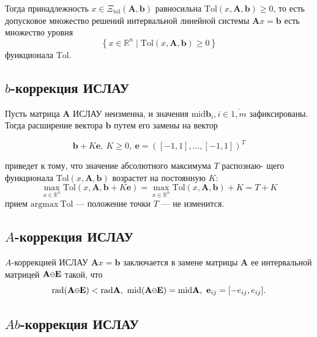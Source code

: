 \documentclass{article}
\newcommand{\kaucher}{
  \begin{tikzpicture}
    \draw (0, 0) circle (0.6ex);
    \draw (-0.6ex, 0) -- (0.6ex, 0);
  \end{tikzpicture}%
}
\begin{document}
  Тогда принадлежность \( x \in \Xi_{\text{tol}} (\mathbf{A}, \mathbf{b}) \)
  равносильна \( \text{Tol} (x, \mathbf{A}, \mathbf{b}) \geq 0 \), то есть
  допусковое множество решений интервальной линейной системы
  \( \mathbf{A} x = \mathbf{b} \) есть множество уровня
  \[
    \left \{ x \in \mathbb{R}^n \mid \text{Tol} (x, \mathbf{A}, \mathbf{b}) \geq 0 \right \}
  \]
  функционала \( \text{Tol} \).

  \vspace{\baselineskip}

  \subsection{\( b \)-коррекция ИСЛАУ}

  Пусть матрица \( \mathbf{A} \) ИСЛАУ неизменна, и значения
  \( \text{mid} \mathbf{b}_i, i \in \overline{1,m} \) зафиксированы. Тогда
  расширение вектора \( \mathbf{b} \) путем его замены на вектор

  \begin{equation} \label{eq:b-correction}
    \mathbf{b} + K\mathbf{e}, \ K \ge 0, \ \mathbf{e} = ([-1, 1], \dots, [-1, 1])^T
  \end{equation}

  приведет к тому, что значение абсолютного максимума \( T \) распознаю-
  щего функционала \( \text{Tol} (x, \mathbf{A}, \mathbf{b}) \) возрастет на
  постоянную \( K \):
  \[
    \max_{x \in \mathbb{R}^n} \text{Tol} (x, \mathbf{A}, \mathbf{b} + K \mathbf{e})
      = \max_{x \in \mathbb{R}^n} \text{Tol} (x, \mathbf{A}, \mathbf{b}) + K = T + K
  \]
  прием \( \text{argmax} \ \text{Tol} \) — положение точки \( T \) ---
  не изменится.

  \subsection{\( A \)-коррекция ИСЛАУ}

  \( A \)-коррекцией ИСЛАУ \( \mathbf{A}x = \mathbf{b} \) заключается
  в замене матрицы \( \mathbf{A} \) ее интервальной матрицей
  \( \mathbf{A} \kaucher \mathbf{E} \) такой, что
  \[
    \text{rad} (\mathbf{A} \kaucher \mathbf{E}) < \text{rad} \mathbf{A}, \
    \text{mid} (\mathbf{A} \kaucher \mathbf{E}) = \text{mid} \mathbf{A}, \
    \mathbf{e}_{ij} = [-e_{ij}, e_{ij}].
  \]

  \subsection{\( Ab \)-коррекция ИСЛАУ}
\end{document}
